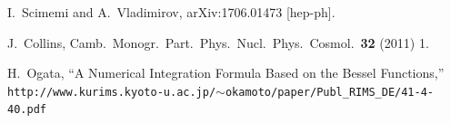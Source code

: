 \documentclass[10pt,a4paper]{article}
\begin{document}
\newpage

\begin{thebibliography}{alp}

  I.~Scimemi and A.~Vladimirov,
  arXiv:1706.01473 [hep-ph].

  J.~Collins,
  Camb.\ Monogr.\ Part.\ Phys.\ Nucl.\ Phys.\ Cosmol.\  {\bf 32} (2011) 1.

  H.~Ogata,
  ``A Numerical Integration Formula Based on the Bessel Functions,''
  \texttt{http://www.kurims.kyoto-u.ac.jp/$\sim$okamoto/paper/Publ\_RIMS\_DE/41-4-40.pdf}

\end{thebibliography}
\end{document}
